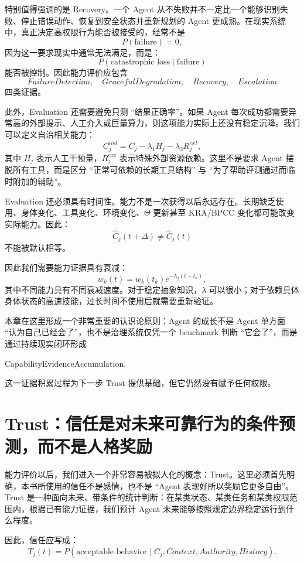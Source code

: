 特别值得强调的是 Recovery。一个 Agent 从不失败并不一定比一个能够识别失败、停止错误动作、恢复到安全状态并重新规划的 Agent 更成熟。在现实系统中，真正决定高权限行为能否被接受的，经常不是
\[
P(\text{failure})=0,
\]
因为这一要求现实中通常无法满足，而是：
\[
P(
\text{catastrophic loss}
\mid
\text{failure}
)
\]
能否被控制。因此能力评价应包含
\[
FailureDetection,
\quad
GracefulDegradation,
\quad
Recovery,
\quad
Escalation
\]
四类证据。

此外，Evaluation 还需要避免只测 ``结果正确率''。如果 Agent 每次成功都需要异常高的外部提示、人工介入或巨量算力，则这项能力实际上还没有稳定沉降。我们可以定义自治相关能力：
\[
C^{ind}_j
=
C_j
-
\lambda_1 H_j
-
\lambda_2 R^{ext}_j,
\]
其中 $H_j$ 表示人工干预量，$R^{ext}_j$ 表示特殊外部资源依赖。这里不是要求 Agent 摆脱所有工具，而是区分 ``正常可依赖的长期工具结构'' 与 ``为了帮助评测通过而临时附加的辅助''。

Evaluation 还必须具有时间性。能力不是一次获得以后永远存在。长期缺乏使用、身体变化、工具变化、环境变化、$\Theta$ 更新甚至 KRA/BPCC 变化都可能改变实际能力。因此：
\[
\hat C_j(t+\Delta)
\neq
\hat C_j(t)
\]
不能被默认相等。

因此我们需要能力证据具有衰减：
\[
w_k(t)
=
w_k(t_k)
e^{-\lambda_j(t-t_k)},
\]
其中不同能力具有不同衰减速度。对于稳定抽象知识，$\lambda$ 可以很小；对于依赖具体身体状态的高速技能，过长时间不使用后就需要重新验证。

本章在这里形成一个非常重要的认识论原则：Agent 的成长不是 Agent 单方面 ``认为自己已经会了''，也不是治理系统仅凭一个 benchmark 判断 ``它会了''，而是通过持续现实闭环形成
\begin{statementbox}
CapabilityEvidenceAccumulation.
\end{statementbox}
这一证据积累过程为下一步 Trust 提供基础，但它仍然没有赋予任何权限。

\section{Trust：信任是对未来可靠行为的条件预测，而不是人格奖励}

能力评价以后，我们进入一个非常容易被拟人化的概念：Trust。这里必须首先明确，本书所使用的信任不是感情，也不是 ``Agent 表现好所以奖励它更多自由''。Trust 是一种面向未来、带条件的统计判断：在某类状态、某类任务和某类权限范围内，根据已有能力证据，我们预计 Agent 未来能够按照规定边界稳定运行到什么程度。

因此，信任应写成：
\[
T_j(t)
=
P(
\text{acceptable behavior}
\mid
C_j,
Context,
Authority,
History
).
\]

